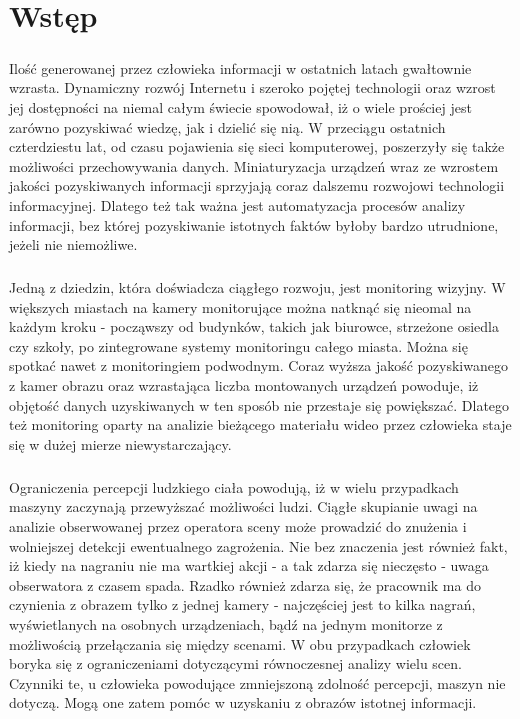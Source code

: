 \chapter{Wstęp}
\label{cha:wstęp}

\paragraph{}
Ilość generowanej przez człowieka informacji w ostatnich latach gwałtownie wzrasta. Dynamiczny rozwój  Internetu i szeroko pojętej technologii  oraz wzrost jej dostępności na niemal całym świecie spowodował, iż o wiele prościej jest zarówno pozyskiwać wiedzę, jak i dzielić się nią. W przeciągu ostatnich czterdziestu lat, od czasu pojawienia się sieci komputerowej, poszerzyły się także możliwości przechowywania danych. Miniaturyzacja urządzeń wraz ze wzrostem jakości pozyskiwanych informacji sprzyjają coraz dalszemu rozwojowi technologii informacyjnej. Dlatego też tak ważna jest automatyzacja procesów analizy informacji, bez której pozyskiwanie istotnych faktów byłoby bardzo utrudnione, jeżeli nie niemożliwe. 
\paragraph{}
Jedną z dziedzin, która doświadcza ciągłego rozwoju, jest monitoring wizyjny. W większych miastach na kamery monitorujące można natknąć się nieomal na każdym kroku - począwszy od budynków, takich jak biurowce, strzeżone osiedla czy szkoły, po zintegrowane systemy monitoringu całego miasta. Można się spotkać nawet z monitoringiem podwodnym. Coraz wyższa jakość pozyskiwanego z kamer obrazu oraz wzrastająca liczba montowanych urządzeń powoduje, iż objętość danych uzyskiwanych w ten sposób nie przestaje się powiększać. Dlatego też monitoring oparty na analizie bieżącego materiału wideo przez człowieka staje się w dużej mierze niewystarczający.
\paragraph{}
Ograniczenia percepcji ludzkiego ciała powodują, iż w wielu przypadkach maszyny zaczynają przewyższać możliwości ludzi. Ciągłe skupianie uwagi na analizie obserwowanej przez operatora sceny może prowadzić do znużenia i wolniejszej detekcji ewentualnego zagrożenia. Nie bez znaczenia jest również fakt, iż kiedy na nagraniu nie ma wartkiej akcji - a tak zdarza się nieczęsto - uwaga obserwatora z czasem spada. Rzadko również zdarza się, że pracownik ma do czynienia z obrazem tylko z jednej kamery - najczęściej jest to kilka nagrań, wyświetlanych na osobnych urządzeniach, bądź na jednym monitorze z możliwością przełączania się między scenami. W obu przypadkach człowiek boryka się z ograniczeniami dotyczącymi równoczesnej analizy wielu scen. Czynniki te, u człowieka powodujące zmniejszoną zdolność percepcji, maszyn nie dotyczą. Mogą one zatem pomóc w uzyskaniu z obrazów istotnej informacji.
